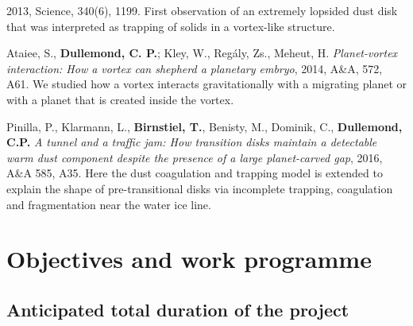 \documentclass[10pt,fleqn,twoside]{article}
\makeatletter
\newcommand{\missing}[1]{\textcolor{red}{\textbf{XXX #1 XXX}}}
\newenvironment{literature}%
 {\begin{multicols}{2}\begin{scriptsize}\begin{list}{}{%
   \setlength{\topsep}{0em}%
   \setlength{\parskip}{0em}%
   \setlength{\parsep}{0em}%
   \setlength{\itemsep}{0em}%
   \setlength{\rightmargin}{0em}%
   \setlength{\leftmargin}{2em}%
   \setlength{\itemindent}{-2em}}}%
 {\end{list}\end{scriptsize}\end{multicols}}
\renewcommand\paragraph{\@startsection{paragraph}{4}{\z@}%
            {-2.5ex\@plus -1ex \@minus -.25ex}%
            {1.25ex \@plus .25ex}%
            {\normalfont\normalsize\bfseries}}
\makeatother
\begin{document}
\begin{literature}
  2013, Science, 340(6), 1199. First observation of an extremely
  lopsided dust disk that was interpreted as trapping of solids in a
  vortex-like structure.
\item Ataiee, S., \textbf{Dullemond, C. P.}; Kley, W., Regály, Zs.,
  Meheut, H. \textit{Planet-vortex interaction: How a vortex can
  shepherd a planetary embryo}, 2014, A\&A, 572, A61. We studied how a
  vortex interacts gravitationally with a migrating planet or with a
  planet that is created inside the vortex.
\item Pinilla, P., Klarmann, L., \textbf{Birnstiel, T.}, Benisty, M.,
  Dominik, C., \textbf{Dullemond, C.P.} {\em A tunnel and a traffic
  jam: How transition disks maintain a detectable warm dust component
  despite the presence of a large planet-carved gap}, 2016, A\&A 585,
  A35. Here the dust coagulation and trapping model is extended to
  explain the shape of pre-transitional disks via incomplete trapping,
  coagulation and fragmentation near the water ice line.
\end{literature}

% 
% 
% 
% 
% 
% 
% 
% 

\section{Objectives and work programme}


\subsection{Anticipated total duration of the project}
\end{document}
